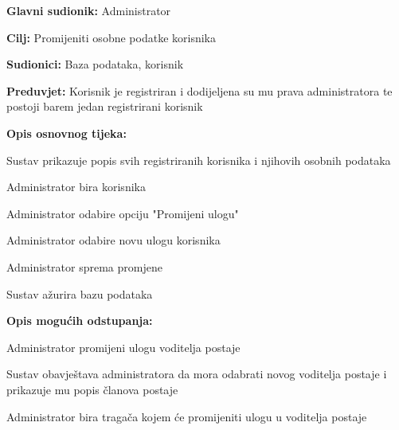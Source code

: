 \begin{packed_item}
\begin{packed_item}
					\noindent {}
					\begin{packed_item}
						
						\item \textbf{Glavni sudionik:} Administrator
						\item \textbf{Cilj:} Promijeniti osobne podatke korisnika
						\item \textbf{Sudionici:} Baza podataka, korisnik
						\item \textbf{Preduvjet:} Korisnik je registriran i dodijeljena su mu prava administratora te postoji barem jedan registrirani korisnik
						\item \textbf{Opis osnovnog tijeka:}
						
						\item[] \begin{packed_enum}
							
							\item Sustav prikazuje popis svih registriranih korisnika i njihovih osobnih podataka
							\item Administrator bira korisnika
							\item Administrator odabire opciju "Promijeni ulogu"
							\item Administrator odabire novu ulogu korisnika
							\item Administrator sprema promjene 
							\item Sustav ažurira bazu podataka					
						\end{packed_enum}
						
						\item  \textbf{Opis mogućih odstupanja:}
						
						\item[] \begin{packed_item}
							
							\item[4.a] Administrator promijeni ulogu voditelja postaje
							\item[] \begin{packed_enum}
								
								\item Sustav obavještava administratora da mora odabrati novog voditelja postaje i prikazuje mu popis članova postaje
								\item Administrator bira tragača kojem će promijeniti ulogu u voditelja postaje
								
							\end{packed_enum}
							

\end{packed_item}
\end{packed_item}
\end{packed_item}
\end{packed_item}
